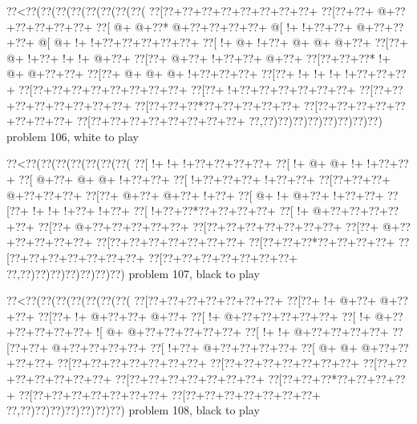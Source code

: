 \vbox{\vbox{\goo
\0??<\0??(\0??(\0??(\0??(\0??(\0??(\0??(\0??(
\0??[\0??+\0??+\0??+\0??+\0??+\0??+\0??+\0??+
\0??[\0??+\0??+\- @+\0??+\0??+\0??+\0??+\0??+
\0??[\- @+\- @+\0??*\- @+\0??+\0??+\0??+\0??+
\- @[\- !+\- !+\0??+\0??+\- @+\0??+\0??+\0??+
\- @[\- @+\- !+\- !+\0??+\0??+\0??+\0??+\0??+
\0??[\- !+\- @+\- !+\0??+\- @+\- @+\- @+\0??+
\0??[\0??+\- @+\- !+\0??+\- !+\- !+\- @+\0??+
\0??[\0??+\- @+\0??+\- !+\0??+\0??+\- @+\0??+
\0??[\0??+\0??+\0??*\- !+\- @+\- @+\0??+\0??+
\0??[\0??+\- @+\- @+\- @+\- !+\0??+\0??+\0??+
\0??[\0??+\- !+\- !+\- !+\- !+\0??+\0??+\0??+
\0??[\0??+\0??+\0??+\0??+\0??+\0??+\0??+\0??+
\0??[\0??+\- !+\0??+\0??+\0??+\0??+\0??+\0??+
\0??[\0??+\0??+\0??+\0??+\0??+\0??+\0??+\0??+
\0??[\0??+\0??+\0??*\0??+\0??+\0??+\0??+\0??+
\0??[\0??+\0??+\0??+\0??+\0??+\0??+\0??+\0??+
\0??[\0??+\0??+\0??+\0??+\0??+\0??+\0??+\0??+
\0??,\0??)\0??)\0??)\0??)\0??)\0??)\0??)\0??)
}
\hfil problem 106, white to play\hfil\break
}

\vbox{\vbox{\goo
\0??<\0??(\0??(\0??(\0??(\0??(\0??(\0??(
\0??[\- !+\- !+\- !+\0??+\0??+\0??+\0??+
\0??[\- !+\- @+\- @+\- !+\- !+\0??+\0??+
\0??[\- @+\0??+\- @+\- @+\- !+\0??+\0??+
\0??[\- !+\0??+\0??+\0??+\- !+\0??+\0??+
\0??[\0??+\0??+\0??+\- @+\0??+\0??+\0??+
\0??[\0??+\- @+\0??+\- @+\0??+\- !+\0??+
\0??[\- @+\- !+\- @+\0??+\- !+\0??+\0??+
\0??[\0??+\- !+\- !+\- !+\0??+\- !+\0??+
\0??[\- !+\0??+\0??*\0??+\0??+\0??+\0??+
\0??[\- !+\- @+\0??+\0??+\0??+\0??+\0??+
\0??[\0??+\- @+\0??+\0??+\0??+\0??+\0??+
\0??[\0??+\0??+\0??+\0??+\0??+\0??+\0??+
\0??[\0??+\- @+\0??+\0??+\0??+\0??+\0??+
\0??[\0??+\0??+\0??+\0??+\0??+\0??+\0??+
\0??[\0??+\0??+\0??*\0??+\0??+\0??+\0??+
\0??[\0??+\0??+\0??+\0??+\0??+\0??+\0??+
\0??[\0??+\0??+\0??+\0??+\0??+\0??+\0??+
\0??,\0??)\0??)\0??)\0??)\0??)\0??)\0??)
}
\hfil problem 107, black to play\hfil\break
}

\vbox{\vbox{\goo
\0??<\0??(\0??(\0??(\0??(\0??(\0??(\0??(
\0??[\0??+\0??+\0??+\0??+\0??+\0??+\0??+
\0??[\0??+\- !+\- @+\0??+\- @+\0??+\0??+
\0??[\0??+\- !+\- @+\0??+\0??+\- @+\0??+
\0??[\- !+\- @+\0??+\0??+\0??+\0??+\0??+
\0??[\- !+\- @+\0??+\0??+\0??+\0??+\0??+
\- ![\- @+\- @+\0??+\0??+\0??+\0??+\0??+
\0??[\- !+\- !+\- @+\0??+\0??+\0??+\0??+
\0??[\0??+\0??+\- @+\0??+\0??+\0??+\0??+
\0??[\- !+\0??+\- @+\0??+\0??+\0??+\0??+
\0??[\- @+\- @+\- @+\0??+\0??+\0??+\0??+
\0??[\0??+\0??+\0??+\0??+\0??+\0??+\0??+
\0??[\0??+\0??+\0??+\0??+\0??+\0??+\0??+
\0??[\0??+\0??+\0??+\0??+\0??+\0??+\0??+
\0??[\0??+\0??+\0??+\0??+\0??+\0??+\0??+
\0??[\0??+\0??+\0??*\0??+\0??+\0??+\0??+
\0??[\0??+\0??+\0??+\0??+\0??+\0??+\0??+
\0??[\0??+\0??+\0??+\0??+\0??+\0??+\0??+
\0??,\0??)\0??)\0??)\0??)\0??)\0??)\0??)
}
\hfil problem 108, black to play\hfil\break
}

